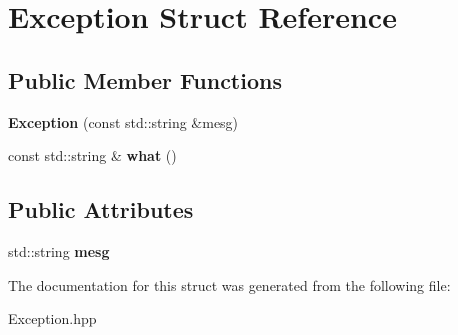 \hypertarget{structException}{}\section{Exception Struct Reference}
\label{structException}
\subsection*{Public Member Functions}
\begin{DoxyCompactItemize}
\item 
\mbox{\label{structException_a1799400f70924aba093edbc6f2ba6bfe}} 
{\bfseries Exception} (const std\+::string \&mesg)
\item 
\mbox{\label{structException_a19be342664e9da07334b8fbe7a253909}} 
const std\+::string \& {\bfseries what} ()
\end{DoxyCompactItemize}
\subsection*{Public Attributes}
\begin{DoxyCompactItemize}
\item 
\mbox{\label{structException_ab13c042e7d550445aa548240ee2ed3e2}} 
std\+::string {\bfseries mesg}
\end{DoxyCompactItemize}


The documentation for this struct was generated from the following file\+:\begin{DoxyCompactItemize}
\item 
Exception.\+hpp\end{DoxyCompactItemize}
